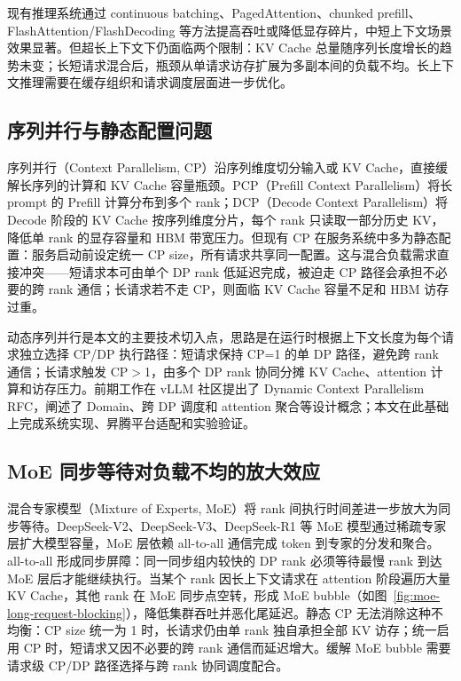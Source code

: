 现有推理系统通过 continuous batching、PagedAttention、chunked prefill、FlashAttention/FlashDecoding 等方法提高吞吐或降低显存碎片\citep{kwon2023efficient,dao2022flashattention,dao2023flashattention2,flashdecoding2023}，中短上下文场景效果显著。但超长上下文下仍面临两个限制：KV Cache 总量随序列长度增长的趋势未变；长短请求混合后，瓶颈从单请求访存扩展为多副本间的负载不均。长上下文推理需要在缓存组织和请求调度层面进一步优化。

\subsection{序列并行与静态配置问题}

序列并行（Context Parallelism, CP）沿序列维度切分输入或 KV Cache，直接缓解长序列的计算和 KV Cache 容量瓶颈。PCP（Prefill Context Parallelism）将长 prompt 的 Prefill 计算分布到多个 rank；DCP（Decode Context Parallelism）将 Decode 阶段的 KV Cache 按序列维度分片，每个 rank 只读取一部分历史 KV，降低单 rank 的显存容量和 HBM 带宽压力\citep{liu2023ringattention,jacobs2023deepspeedulysses,fang2024usp,zhong2024contextparallelism,vllmascendcp2026}。但现有 CP 在服务系统中多为静态配置：服务启动前设定统一 CP size，所有请求共享同一配置。这与混合负载需求直接冲突——短请求本可由单个 DP rank 低延迟完成，被迫走 CP 路径会承担不必要的跨 rank 通信；长请求若不走 CP，则面临 KV Cache 容量不足和 HBM 访存过重。

动态序列并行是本文的主要技术切入点，思路是在运行时根据上下文长度为每个请求独立选择 CP/DP 执行路径：短请求保持 CP=1 的单 DP 路径，避免跨 rank 通信；长请求触发 CP$>$1，由多个 DP rank 协同分摊 KV Cache、attention 计算和访存压力。前期工作在 vLLM 社区提出了 Dynamic Context Parallelism RFC\citep{vllmdynamiccp2025}，阐述了 Domain、跨 DP 调度和 attention 聚合等设计概念；本文在此基础上完成系统实现、昇腾平台适配和实验验证。

\subsection{MoE 同步等待对负载不均的放大效应}

混合专家模型（Mixture of Experts, MoE）将 rank 间执行时间差进一步放大为同步等待。DeepSeek-V2、DeepSeek-V3、DeepSeek-R1 等 MoE 模型通过稀疏专家层扩大模型容量，MoE 层依赖 all-to-all 通信完成 token 到专家的分发和聚合\citep{lepikhin2020gshard,fedus2021switch,deepseekai2024deepseekv2,deepseekai2025deepseekv3,deepseekai2025deepseekr1}。all-to-all 形成同步屏障：同一同步组内较快的 DP rank 必须等待最慢 rank 到达 MoE 层后才能继续执行。当某个 rank 因长上下文请求在 attention 阶段遍历大量 KV Cache，其他 rank 在 MoE 同步点空转，形成 MoE bubble（如图~\ref{fig:moe-long-request-blocking}），降低集群吞吐并恶化尾延迟。静态 CP 无法消除这种不均衡：CP size 统一为 1 时，长请求仍由单 rank 独自承担全部 KV 访存；统一启用 CP 时，短请求又因不必要的跨 rank 通信而延迟增大。缓解 MoE bubble 需要请求级 CP/DP 路径选择与跨 rank 协同调度配合。

